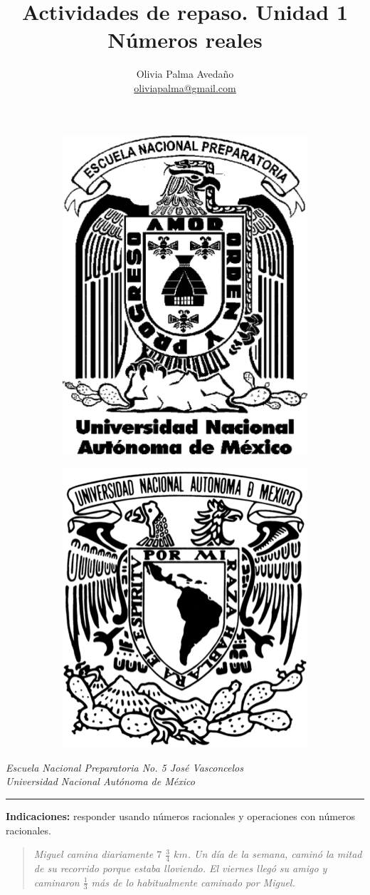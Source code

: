 \documentclass[letterpaper,11pt]{article}
\title{Actividades de repaso. Unidad 1\\
Números reales}
\author{Olivia Palma Avedaño \\ \href{mailto:
oliviapalma@gmail.com}{oliviapalma@gmail.com}}
\date{}
\begin{document}
\maketitle
\begin{figure}[t!]
\begin{subfigure}{.5\textwidth}
\flushleft  \includegraphics[width=.3\linewidth]{ENPlogo.jpg}
\end{subfigure}
\begin{subfigure}{.5\textwidth}
\flushright  \includegraphics[width=.3\linewidth]{unam_logo.jpg}
\end{subfigure}
\end{figure}

\begin{center}
  \textit{Escuela Nacional Preparatoria No. 5 José Vasconcelos\\
Universidad Nacional Autónoma de México}


	\vspace*{0.1cm}
	
	\begin{center}\rule{0.9\textwidth}{0.1mm} \end{center}

  
\end{center}

\textbf{Indicaciones:} responder usando números racionales y operaciones con números racionales.

\begin{quote}
\textit{Miguel camina diariamente $7$ $\frac{3}{4}$ $km$. Un día de la semana, caminó la mitad de su recorrido porque estaba lloviendo. El viernes llegó su amigo y caminaron $\frac{1}{3}$ más de lo habitualmente caminado por Miguel.}
\end{quote}
\end{document}
